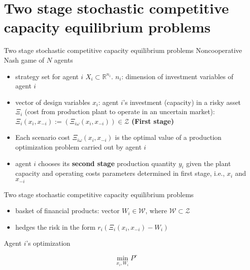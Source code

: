 \documentclass{beamer}
\begin{document}
\section{Two stage stochastic competitive capacity equilibrium problems}

\begin{frame}{Two stage stochastic competitive capacity equilibrium problems}
Noncooperative Nash game of $N$ agents
\begin{itemize}
    \item strategy set for agent $i$ $X_i \subset \mathbb{R}^{n_i}$. $n_i$: dimension of investment variables of agent $i$
    \item vector of design variables $x_i$: agent $i$'s investment (capacity)  in a risky asset $\Xi_i$ (cost from production plant to operate in an uncertain market): $\Xi_i(x_i,x_{-i}):= (\Xi_{i\omega}(x_i, x_{-i})) \in \mathcal{Z}$ \textbf{(First stage)}
    \item Each scenario cost $\Xi_{i\omega}(x_i, x_{-i})$ is the optimal value of a production optimization problem carried out by agent $i$
    \item agent $i$ chooses its \textbf{second stage } production quantity $y_i$ given the plant capacity and operating costs parameters determined in first stage, i.e., $x_i$ and $x_{-i}$
\end{itemize}
    
\end{frame}

\begin{frame}{Two stage stochastic competitive capacity equilibrium problems}
    \begin{itemize}
        \item basket of financial products: vector $W_i \in \mathcal{W}$, where $\mathcal{W} \subset
        \mathcal{Z}$
        \item hedges the risk in the form $r_i(\Xi_i(x_i,x_{-i})-W_i)$
        
    \end{itemize}
    
    
    \begin{block}{Agent $i$'s optimization}
    
    $$\min_{x_i,W_i}P^r$$
    
    \end{block}
\end{frame}

\end{document}
